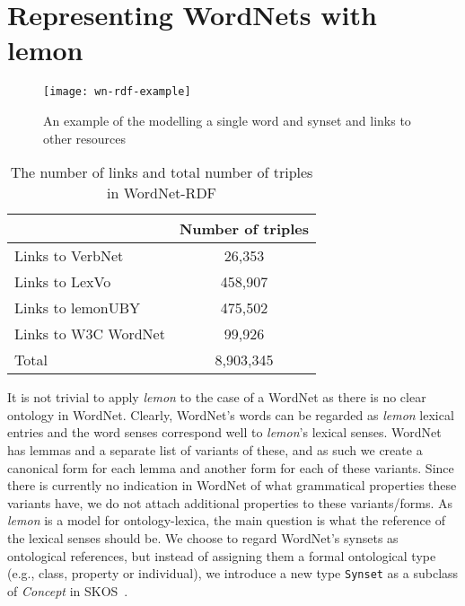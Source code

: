 \documentclass[10pt, a4paper]{article}
\newcommand{\lemon}[0]{\emph{lemon}}
\begin{document}
\section{Representing WordNets with lemon}

\begin{figure}
    \texttt{[image: wn-rdf-example]}
    \caption{An example of the modelling a single word and synset and links to
        other resources\label{modelling_example}}
\end{figure}



\begin{table}
  \begin{tabular}{p{50mm}|c}
     & Number of triples \\
    \hline
    Links to VerbNet & 26,353 \\
    Links to LexVo & 458,907 \\
    Links to lemonUBY & 475,502 \\
    Links to W3C WordNet & 99,926 \\
    \hline
    Total & 8,903,345 \\
  \end{tabular}
  \caption{The number of links and total number of triples in
      WordNet-RDF\label{triple_counts}}
\end{table}

It is not trivial to apply \lemon{} to the case of a WordNet as there is no
clear ontology in WordNet.
Clearly, WordNet's 
words can be regarded as \lemon{} lexical entries and the word senses correspond
well to \lemon{}'s lexical senses. WordNet has lemmas and a separate list of
variants of these, and as such we create a canonical form for each lemma and another 
form for each of these variants. Since there is currently no indication in
WordNet of what grammatical properties these variants have, we do not attach additional properties to these variants/forms. As \lemon{} is a model for
ontology-lexica, the main question is what the reference of the lexical senses should be.
We choose to regard WordNet's synsets as ontological references, but instead of assigning them a formal ontological type (e.g.,
class, property or individual), we introduce a new type {\tt Synset} as a subclass of \emph{Concept} in SKOS~\cite{miles2007skos}.
\end{document}
